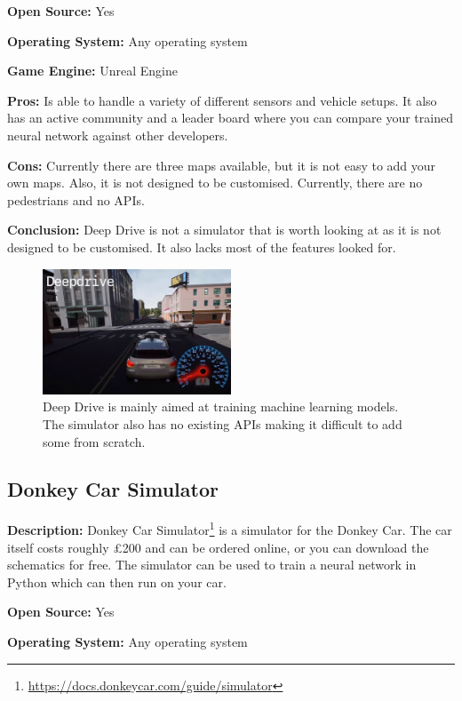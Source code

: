\textbf{Open Source:} Yes

\textbf{Operating System:} Any operating system

\textbf{Game Engine:} Unreal Engine

\textbf{Pros:} Is able to handle a variety of different sensors and vehicle setups. It also has an active community and a leader board where you can compare your trained neural network against other developers. 

\textbf{Cons:} Currently there are three maps available, but it is not easy to add your own maps. Also, it is not designed to be customised. Currently, there are no pedestrians and no APIs.

\textbf{Conclusion:} Deep Drive is not a simulator that is worth looking at as it is not designed to be customised. It also lacks most of the features looked for. 

\begin{figure}[H]
    \centering
    \includegraphics[width=0.5\textwidth]{03_Background/Appendix/Simulators/DeepDrive.JPG}
    \caption[Deep Drive]{Deep Drive is mainly aimed at training machine learning models. The simulator also has no existing APIs making it difficult to add some from scratch.}
\end{figure}

\subsection{Donkey Car Simulator}
\textbf{Description:} Donkey Car Simulator\footnote{\url{https://docs.donkeycar.com/guide/simulator}} is a simulator for the Donkey Car. The car itself costs roughly £200 and can be ordered online, or you can download the schematics for free. The simulator can be used to train a neural network in Python which can then run on your car. 

\textbf{Open Source:} Yes

\textbf{Operating System:} Any operating system

